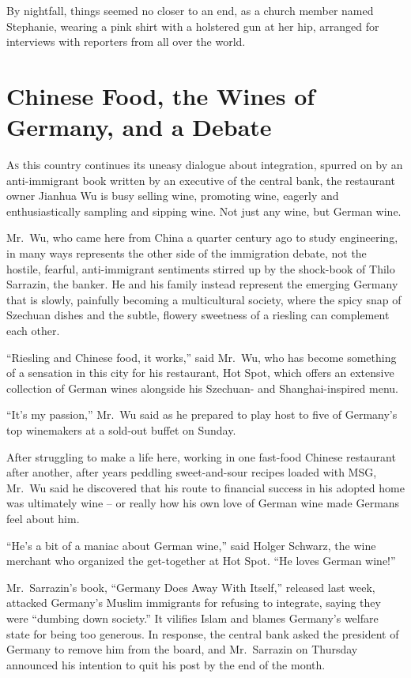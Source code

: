 ﻿\documentclass[12pt]{article}
\begin{document}
By nightfall, things seemed no closer to an end, as a church member named Stephanie, wearing a pink
shirt with a holstered gun at her hip, arranged for interviews with reporters from all over the
world.

\pagebreak
\section{Chinese Food, the Wines of Germany, and a Debate}

\lettrine{A}{s} this country continues its uneasy dialogue about
integration, spurred on by an anti-immigrant book written by an executive of the central bank, the
restaurant owner Jianhua Wu is busy selling wine, promoting wine, eagerly and enthusiastically
sampling and sipping wine. Not just any wine, but German wine.

Mr.~Wu, who came here from China a quarter century ago to study engineering, in many ways represents
the other side of the immigration debate, not the hostile, fearful, anti-immigrant sentiments
stirred up by the shock-book of Thilo Sarrazin, the banker. He and his family instead represent the
emerging Germany that is slowly, painfully becoming a multicultural society, where the spicy snap of
Szechuan dishes and the subtle, flowery sweetness of a riesling can complement each other.

``Riesling and Chinese food, it works,'' said Mr.~Wu, who has become something of a sensation in
this city for his restaurant, Hot Spot, which offers an extensive collection of German wines
alongside his Szechuan- and Shanghai-inspired menu.

``It's my passion,'' Mr.~Wu said as he prepared to play host to five of Germany's top winemakers at
a sold-out buffet on Sunday.

After struggling to make a life here, working in one fast-food Chinese restaurant after another,
after years peddling sweet-and-sour recipes loaded with MSG, Mr.~Wu said he discovered that his
route to financial success in his adopted home was ultimately wine -- or really how his own love of
German wine made Germans feel about him.

``He's a bit of a maniac about German wine,'' said Holger Schwarz, the wine merchant who organized
the get-together at Hot Spot. ``He loves German wine!''

Mr.~Sarrazin's book, ``Germany Does Away With Itself,'' released last week, attacked Germany's
Muslim immigrants for refusing to integrate, saying they were ``dumbing down society.'' It vilifies
Islam and blames Germany's welfare state for being too generous. In response, the central bank asked
the president of Germany to remove him from the board, and Mr.~Sarrazin on Thursday announced his
intention to quit his post by the end of the month.
\end{document}
